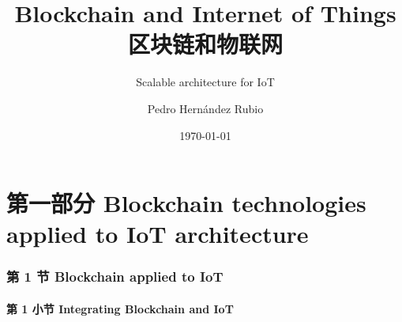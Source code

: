 \documentclass[
    aspectratio=169,                   %
]{beamer}
\begin{document}
    \title{Blockchain and Internet of Things 区块链和物联网}  %
    \subtitle{Scalable architecture for IoT}         %
    \author{Pedro Hernández Rubio}                  %
    \date{\today}                          %
    \maketitle                             %

\part{第一部分 Blockchain technologies applied to IoT architecture}

\AtBeginSection[]{
    \begin{frame}
        \sectionpage                   %
    \end{frame}
}


\section{第 1 节 Blockchain applied to IoT}

\subsection{第 1 小节 Integrating Blockchain and IoT}
\end{document}
